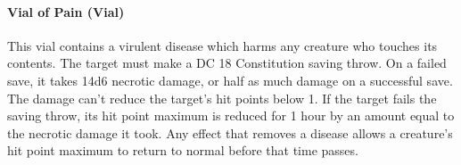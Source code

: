 \paragraph{Vial of Pain (Vial)} %
    This vial contains a virulent disease which harms any creature who touches its contents.
    The target must make a DC 18 Constitution saving throw.
    On a failed save, it takes 14d6 necrotic damage, or half as much damage on a successful save.
    The damage can't reduce the target's hit points below 1.
    If the target fails the saving throw, its hit point maximum is reduced for 1 hour by an amount equal to the necrotic damage it took.
    Any effect that removes a disease allows a creature's hit point maximum to return to normal before that time passes.

